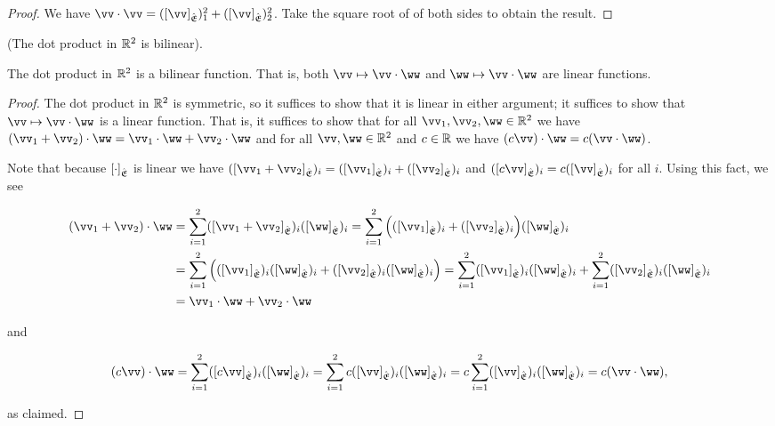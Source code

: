 \begin{proof}
    We have $\vv \cdot \vv = ([\vv]_\sE)_1^2 + ([\vv]_\sE)_2^2$. Take the square root of of both sides to obtain the result.
\end{proof}

\begin{theorem}
    (The dot product in $\mathbb{R}^2$ is bilinear).

    The dot product in $\mathbb{R}^2$ is a bilinear function. That is, both $\vv \mapsto \vv \cdot \ww$ and $\ww \mapsto \vv \cdot \ww$ are linear functions.
\end{theorem}

\begin{proof}
    The dot product in $\mathbb{R}^2$ is symmetric, so it suffices to show that it is linear in either argument; it suffices to show that $\vv \mapsto \vv \cdot \ww$ is a linear function. That is, it suffices to show that for all $\vv_1, \vv_2, \ww \in \R^2$ we have $(\vv_1 + \vv_2) \cdot \ww = \vv_1 \cdot \ww + \vv_2 \cdot \ww$ and for all $\vv, \ww \in \R^2$ and $c \in \mathbb{R}$ we have $(c\vv) \cdot \ww = c(\vv \cdot \ww)$.
    
    Note that because $[\cdot]_{\hat{\mathfrak{E}}}$ is linear we have $([\vv_1 + \vv_2]_\sE)_i = ([\vv_1]_\sE)_i + ([\vv_2]_\sE)_i$ and $([c\vv]_\sE)_i = c([\vv]_\sE)_i$ for all $i$. Using this fact, we see

    \begin{align*}
        (\vv_1 + \vv_2) \cdot \ww
        &= \sum_{i = 1}^2 ([\vv_1 + \vv_2]_\sE)_i ([\ww]_\sE)_i
        = \sum_{i = 1}^2 \Big(([\vv_1]_\sE)_i + ([\vv_2]_\sE)_i\Big) ([\ww]_\sE)_i \\
        &= \sum_{i = 1}^2 \Big( ([\vv_1]_\sE)_i ([\ww]_\sE)_i + ([\vv_2]_\sE)_i ([\ww]_\sE)_i \Big)
        = \sum_{i = 1}^2 ([\vv_1]_\sE)_i ([\ww]_\sE)_i + \sum_{i = 1}^2 ([\vv_2]_\sE)_i ([\ww]_\sE)_i \\
        &= \vv_1 \cdot \ww + \vv_2 \cdot \ww
    \end{align*}

    and

    \begin{align*}
        (c\vv) \cdot \ww
        = \sum_{i = 1}^2 ([c\vv]_\sE)_i ([\ww]_\sE)_i
        = \sum_{i = 1}^2 c([\vv]_\sE)_i ([\ww]_\sE)_i
        = c \sum_{i = 1}^2 ([\vv]_\sE)_i ([\ww]_\sE)_i
        = c(\vv \cdot \ww),
    \end{align*}

    as claimed.    
\end{proof}


